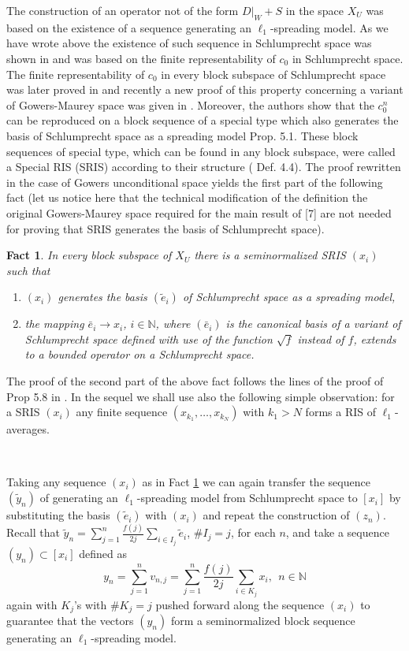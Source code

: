 \documentclass{amsart}
\newtheorem{fact}[theorem]{Fact}
\numberwithin{subsection}{section}
\numberwithin{equation}{section}
\begin{document}
The construction of an operator not of the form $D|_W+S$ in the space $X_U$ was based on the existence of a sequence generating an $\ell_{1}$-spreading model. As we have wrote above the existence of such sequence in Schlumprecht space was shown in \cite{KL} and was based on the finite representability  of $c_{0}$  in Schlumprecht space.  The finite representability  of $c_{0}$ in every block subspace of Schlumprecht space was later proved in \cite{M} and recently a new proof of this property concerning a variant of Gowers-Maurey space was given in \cite{FS}. Moreover, the authors show that the $c_{0}^{n}$ can be reproduced on a block sequence of a special type which also generates the basis of Schlumprecht space as a spreading model \cite{FS} Prop. 5.1. These  block sequences of special type, which can be found in any block subspace, were called a Special RIS (SRIS) according to their structure (\cite{FS} Def. 4.4). The proof rewritten in the case of Gowers unconditional space yields the first part of the following fact (let us notice here that the technical modification of the definition the original Gowers-Maurey space required for the main result of [7] are not needed for proving that SRIS generates the basis of Schlumprecht space).
\begin{fact}\label{fact6}
In every block subspace of $X_U$ there is a seminormalized SRIS $(x_i)$ such that 
\begin{enumerate}
 \item $(x_i)$ generates the basis $(\tilde{e}_i)$ of Schlumprecht space as a spreading model,
\item the mapping $\bar{e}_i\to x_i$, $i\in{{\mathbb{N}}}$, where $(\bar{e}_i) $ is the canonical basis of a variant of Schlumprecht space defined with use of the function $\sqrt{f}$ instead of $f$, extends to a bounded operator on a Schlumprecht space.
\end{enumerate}
 \end{fact}
The proof of the second part of the above fact follows the lines of the proof of Prop 5.8 in \cite{M}. In the sequel we shall use also the following simple observation: for a SRIS $(x_i)$ any finite sequence $(x_{k_1}, \dots, x_{k_N})$ with $k_1>N$ forms a RIS of $\ell_1$-averages.

\

Taking any sequence $(x_i)$ as in Fact \ref{fact6} we can again transfer the sequence $(\tilde{y}_n)$ of \cite{KL} generating an $\ell_1$-spreading model from Schlumprecht space to $[x_i]$ by substituting the basis $(\tilde{e}_i)$ with $(x_i)$ and repeat the construction of $(z_n)$. Recall that $\tilde{y}_n=\sum_{j=1}^n\frac{f(j)}{2j}\sum_{i\in I_j}\tilde{e}_i$, $\# I_j=j$, for each $n$, and take a sequence $(y_n)\subset [x_i]$ defined as
$$
y_n=\sum_{j=1}^nv_{n,j}=\sum_{j=1}^n\frac{f(j)}{2j}\sum_{i\in K_j}x_i, \ \ n\in{{\mathbb{N}}}
$$
again with $K_j$'s with $\# K_j=j$ pushed forward along the sequence $(x_i)$ to guarantee that the vectors $(y_n)$ form a seminormalized block sequence generating an $\ell_1$-spreading model. 
\end{document}
